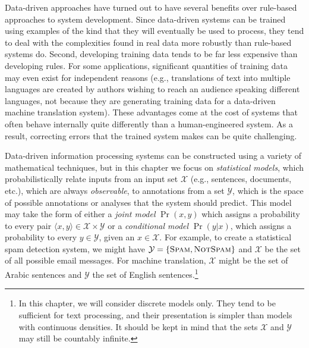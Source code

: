 Data-driven approaches have turned out to have several benefits over
rule-based approaches to system development.  Since data-driven
systems can be trained using examples of the kind that they will
eventually be used to process, they tend to deal with the complexities
found in real data more robustly than rule-based systems do.  Second,
developing training data tends to be far less expensive than
developing rules.  For some applications, significant quantities of
training data may even exist for independent reasons (e.g.,
translations of text into multiple languages are created by authors
wishing to reach an audience speaking different languages, not because
they are generating training data for a data-driven machine
translation system).  These advantages come at the cost of systems
that often behave internally quite differently than a human-engineered
system.  As a result, correcting errors that the trained system makes
can be quite challenging.

Data-driven information processing systems can be constructed using a
variety of mathematical techniques, but in this chapter we focus on
\emph{statistical models}, which probabilistically relate inputs from
an input set $\mathcal{X}$ (e.g., sentences, documents, etc.), which
are always \emph{observable}, to annotations from a set $\mathcal{Y}$,
which is the space of possible annotations or analyses that the system
should predict.  This model may take the form of either a \emph{joint
  model} $\Pr(x,y)$ which assigns a probability to every pair $\langle
x,y \rangle \in \mathcal{X} \times \mathcal{Y}$ or a \emph{conditional
  model} $\Pr(y|x)$, which assigns a probability to every $y \in
\mathcal{Y}$, given an $x \in \mathcal{X}$. For example, to create a
statistical spam detection system, we might have
$\mathcal{Y}=\{\textsc{Spam},\textsc{NotSpam}\}$ and $\mathcal{X}$ be
the set of all possible email messages.  For machine translation,
$\mathcal{X}$ might be the set of Arabic sentences and $\mathcal{Y}$
the set of English sentences.\footnote{In this chapter, we will
  consider discrete models only. They tend to be sufficient for text
  processing, and their presentation is simpler than models with
  continuous densities.  It should be kept in mind that the sets
  $\mathcal{X}$ and $\mathcal{Y}$ may still be countably infinite.}

